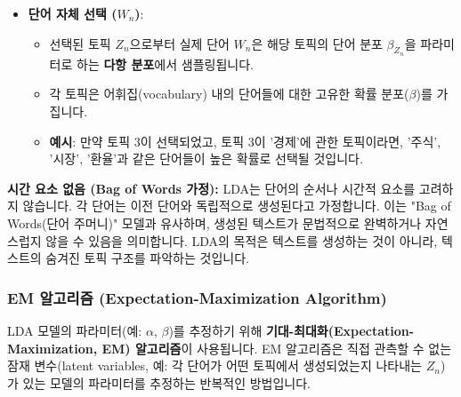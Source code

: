 \documentclass[11pt,a4paper]{article}
\theoremstyle{definition}
\begin{document}
\begin{enumerate}
\begin{itemize}
\begin{itemize}
        \end{itemize}
        \item \textbf{단어 자체 선택 ($W_n$)}:
        \begin{itemize}
            \item 선택된 토픽 $Z_n$으로부터 실제 단어 $W_n$은 해당 토픽의 단어 분포 $\beta_{Z_n}$을 파라미터로 하는 \textbf{다항 분포}에서 샘플링됩니다.
            \item 각 토픽은 어휘집(vocabulary) 내의 단어들에 대한 고유한 확률 분포($\beta$)를 가집니다.
            \item \textbf{예시}: 만약 토픽 3이 선택되었고, 토픽 3이 '경제'에 관한 토픽이라면, '주식', '시장', '환율'과 같은 단어들이 높은 확률로 선택될 것입니다.
        \end{itemize}
    \end{itemize}
\end{enumerate}

\begin{warningbox}
\textbf{시간 요소 없음 (Bag of Words 가정):}
LDA는 단어의 순서나 시간적 요소를 고려하지 않습니다. 각 단어는 이전 단어와 독립적으로 생성된다고 가정합니다. 이는 "Bag of Words(단어 주머니)" 모델과 유사하며, 생성된 텍스트가 문법적으로 완벽하거나 자연스럽지 않을 수 있음을 의미합니다. LDA의 목적은 텍스트를 생성하는 것이 아니라, 텍스트의 숨겨진 토픽 구조를 파악하는 것입니다.
\end{warningbox}

\subsubsection*{EM 알고리즘 (Expectation-Maximization Algorithm)}
\begin{infobox} %
LDA 모델의 파라미터(예: $\alpha$, $\beta$)를 추정하기 위해 \textbf{기대-최대화(Expectation-Maximization, EM) 알고리즘}이 사용됩니다.
EM 알고리즘은 직접 관측할 수 없는 잠재 변수(latent variables, 예: 각 단어가 어떤 토픽에서 생성되었는지 나타내는 $Z_n$)가 있는 모델의 파라미터를 추정하는 반복적인 방법입니다.
\end{infobox}
\end{document}
